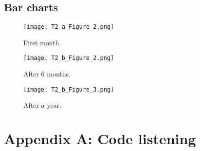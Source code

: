 \documentclass[a4paper]{article}
\begin{document}
\subsection{Bar charts}
\begin{figure}[H]
\centering
\texttt{[image: T2\_a\_Figure\_2.png]}
\caption{\label{fig:table}First month.}
\end{figure}

\begin{figure}[H]
\centering
\texttt{[image: T2\_b\_Figure\_2.png]}
\caption{\label{fig:table}After 6 months.}
\end{figure}

\begin{figure}[H]
\centering
\texttt{[image: T2\_b\_Figure\_3.png]}
\caption{\label{fig:table}After a year.}
\end{figure}
\newpage 
\section{Appendix A: Code listening}
\end{document}

